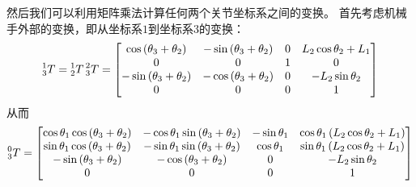 \documentclass{ctexart}
\begin{document}
然后我们可以利用矩阵乘法计算任何两个关节坐标系之间的变换。
首先考虑机械手外部的变换，即从坐标系$1$到坐标系$3$的变换：
\[
    \prescript{1}{3}{T} = \prescript{1}{2}{T} \prescript{2}{3}{T} =
    \begin{bmatrix}
        \cos{\left( {{\theta }_3}+{{\theta }_2}\right) } & -\sin{\left( {{\theta }_3}+{{\theta }_2}\right) } & 0 & {L_2} \cos{ {{\theta }_2} }+{L_1}\\
        0 & 0 & 1 & 0\\
        -\sin{\left( {{\theta }_3}+{{\theta }_2}\right) } & -\cos{\left( {{\theta }_3}+{{\theta }_2}\right) } & 0 & - {L_2} \sin{ {{\theta }_2} } \\
        0 & 0 & 0 & 1
    \end{bmatrix}
\]
从而
\[
    \prescript{0}{3}{T} =
    \begin{bmatrix}
        \cos \theta_1 \cos{\left( {{\theta }_3}+{{\theta }_2}\right) } & - \cos \theta_1 \sin{\left( {{\theta }_3}+{{\theta }_2}\right) }  & -\sin \theta_1 & \cos \theta_1 \left( {L_2} \cos\theta_2+{L_1}\right) \\
            \sin \theta_1 \cos{\left( {{\theta }_3}+{{\theta }_2}\right) } & - \sin \theta_1 \sin{\left( {{\theta }_3}+{{\theta }_2}\right) }  & \cos \theta_1 & \sin \theta_1 \left( {L_2} \cos\theta_2+{L_1}\right) \\
            -\sin{\left( {{\theta }_3}+{{\theta }_2}\right) } & -\cos{\left( {{\theta }_3}+{{\theta }_2}\right) } & 0 & - {L_2} \sin \theta_2 \\
            0 & 0 & 0 & 1
    \end{bmatrix}
\]
\end{document}
